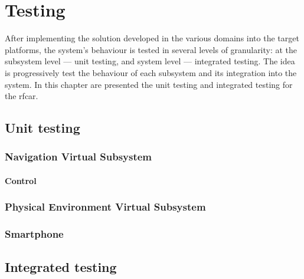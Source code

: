 \chapter{Testing}%
\label{ch:testing}
After implementing the solution developed in the various domains into the
target platforms, the system's behaviour is tested in several levels of
granularity: at the subsystem level --- unit testing, and system level ---
integrated testing. The idea is progressively test the behaviour of each
subsystem and its integration into the system.
In this chapter are presented the unit testing and integrated testing for the \gls{rfcar}.
%
\section{Unit testing}%
\label{sec:unit-testing}
    \subsection{Navigation Virtual Subsystem}%
    \label{sec:navig-virt-subsyst-implem}
    \subsubsection{Control}%
    \label{sec:control-design}
    
    \subsection{Physical Environment Virtual Subsystem}%
    \label{sec:phys-envir-virt-design}
    
    \subsection{Smartphone}%
    \label{sec:smartphone-testing}
    
\section{Integrated testing}%
\label{sec:integrated-testing}
%
%
%
